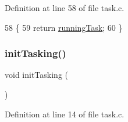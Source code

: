 Definition at line 58 of file task.\+c.


\begin{DoxyCode}
58                         \{
59     \textcolor{keywordflow}{return} \hyperlink{a00053_a2c195d425b4a6791b3a89f7b219f93d9_a2c195d425b4a6791b3a89f7b219f93d9}{runningTask};
60 \}
\end{DoxyCode}
\mbox{\label{a00056_aea945e91746a54801f4763ad264746b9_aea945e91746a54801f4763ad264746b9}} 
\subsubsection{\texorpdfstring{init\+Tasking()}{initTasking()}}
{\footnotesize\ttfamily void init\+Tasking (\begin{DoxyParamCaption}{ }\end{DoxyParamCaption})}



Definition at line 14 of file task.\+c.


